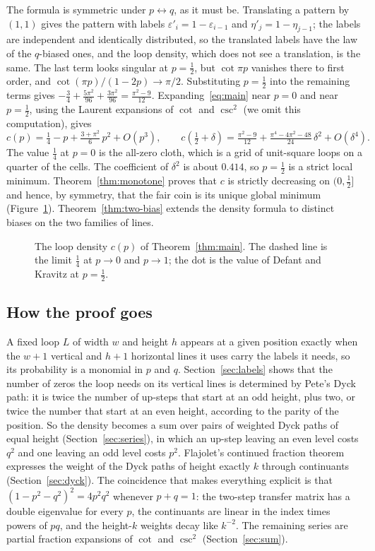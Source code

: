 \documentclass[11pt]{amsart}
\theoremstyle{definition}
\theoremstyle{remark}
\begin{document}
The formula is symmetric under $p\leftrightarrow q$, as it must be. Translating a pattern by $(1,1)$
gives the pattern with labels $\varepsilon'_i=1-\varepsilon_{i-1}$ and $\eta'_j=1-\eta_{j-1}$; the labels
are independent and identically distributed, so the translated labels have the law of the
$q$-biased ones, and the loop density, which does not see a translation, is the same. The last term looks singular at $p=\tfrac12$, but
$\cot\pi p$ vanishes there to first order, and $\cot(\pi p)/(1-2p)\to\pi/2$. Substituting $p=\tfrac12$
into the remaining terms gives $-\tfrac34+\tfrac{5\pi^2}{96}+\tfrac{3\pi^2}{96}=\tfrac{\pi^2-9}{12}$.
Expanding~\eqref{eq:main} near $p=0$ and near $p=\tfrac12$, using the Laurent expansions of $\cot$ and
$\csc^2$ (we omit this computation), gives
\[
c(p)=\tfrac14-p+\tfrac{3+\pi^2}{6}\,p^2+O(p^3),\qquad
c(\tfrac12+\delta)=\tfrac{\pi^2-9}{12}+\tfrac{\pi^4-4\pi^2-48}{24}\,\delta^2+O(\delta^4).
\]
The value $\tfrac14$ at $p=0$ is the all-zero cloth, which is a grid of unit-square loops on a quarter
of the cells. The coefficient of $\delta^2$ is about $0.414$, so $p=\tfrac12$ is a strict local minimum.
Theorem~\ref{thm:monotone} proves that $c$ is strictly decreasing on $(0,\tfrac12]$ and hence, by
symmetry, that the fair coin is its unique global minimum (Figure~\ref{fig:density}).
Theorem~\ref{thm:two-bias} extends the density formula to distinct biases on the two families of lines.

\begin{figure}[t]
\centering

\caption{The loop density $c(p)$ of Theorem~\ref{thm:main}. The dashed line is the limit $\tfrac14$ at
$p\to0$ and $p\to1$; the dot is the value of Defant and Kravitz at $p=\tfrac12$.}
\label{fig:density}
\end{figure}

\subsection*{How the proof goes}
A fixed loop $L$ of width $w$ and height $h$ appears at a given position exactly when the $w+1$ vertical
and $h+1$ horizontal lines it uses carry the labels it needs, so its probability is a monomial in $p$
and $q$. Section~\ref{sec:labels} shows that the number of zeros the loop needs on its vertical lines
is determined by Pete's Dyck path: it is twice the number of up-steps that start at an odd height, plus
two, or twice the number that start at an even height, according to the parity of the position. So the
density becomes a sum over pairs of weighted Dyck paths of equal height
(Section~\ref{sec:series}), in which an up-step leaving an even level costs $q^2$ and one leaving an odd
level costs $p^2$. Flajolet's continued fraction theorem expresses the weight of the Dyck paths of height
exactly $k$ through continuants (Section~\ref{sec:dyck}). The coincidence that makes everything explicit
is that $(1-p^2-q^2)^2=4p^2q^2$ whenever $p+q=1$: the two-step transfer matrix has a double eigenvalue
for every $p$, the continuants are linear in the index times powers of $pq$, and the height-$k$ weights
decay like $k^{-2}$. The remaining series are partial fraction expansions of $\cot$ and $\csc^2$
(Section~\ref{sec:sum}).
\end{document}
